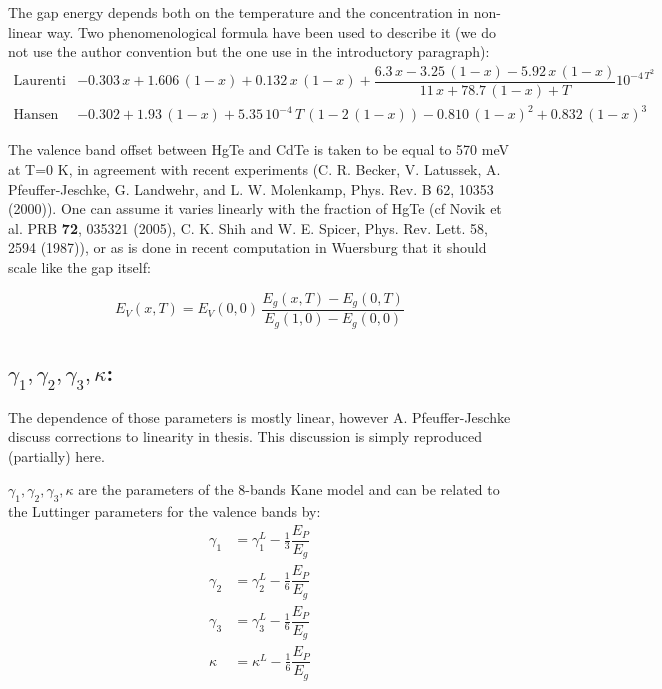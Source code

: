 \documentclass[prb,aps]{revtex4}
\begin{document}
    
        The gap energy depends both on the temperature and the concentration in non-linear way. Two phenomenological formula have been used to describe it (we do not use the author convention but the one use in the introductory paragraph):
        \begin{align}
            \text{Laurenti}& -0.303\,x + 1.606\,(1-x) + 0.132\,x\,(1-x) + \dfrac{6.3\,x - 3.25\,(1-x) - 5.92\,x\,(1-x)}{11\,x + 78.7\,(1-x) + T}10^{-4\,T^2}\\
            \text{Hansen}& -0.302 + 1.93\,(1-x) + 5.35\,10^{-4}\,T\,(1-2\,(1-x)) -0.810\,(1-x)^2 + 0.832\,(1-x)^3
        \end{align}
        
        The valence band offset between HgTe and CdTe is taken to be equal to 570 meV at T=0 K, in  agreement  with  recent  experiments (C. R. Becker, V. Latussek, A. Pfeuffer-Jeschke, G. Landwehr, and L. W. Molenkamp, Phys. Rev. B 62, 10353 (2000)). One can assume it varies linearly with the fraction of HgTe (cf Novik et al. PRB {\bf 72}, 035321 (2005), C. K. Shih and W. E. Spicer, Phys. Rev. Lett. 58, 2594 (1987)), or as is done in recent computation in Wuersburg that it should scale like the gap itself:
        
        \begin{equation}
            E_V(x, T) = E_V(0, 0)\,\frac{E_g(x, T) - E_g(0, T)}{E_g(1, 0) - E_g(0, 0)}
        \end{equation}
        
    \subsection{$γ_1, γ_2, γ_3, κ$:}
    
        The dependence of those parameters is mostly linear, however A. Pfeuffer-Jeschke discuss corrections to linearity in thesis. This discussion is simply reproduced (partially) here.
        
        $γ_1, γ_2, γ_3, κ$ are the parameters of the 8-bands Kane model and can be related to the Luttinger parameters for the valence bands by:
        \begin{align}
            γ_1 &= γ_1^L - \frac13 \dfrac{E_P}{E_g}\\
            γ_2 &= γ_2^L - \frac16 \dfrac{E_P}{E_g}\\
            γ_3 &= γ_3^L - \frac16 \dfrac{E_P}{E_g}\\
            κ &= κ^L - \frac16 \dfrac{E_P}{E_g}\\
        \end{align}
        
\end{document}
